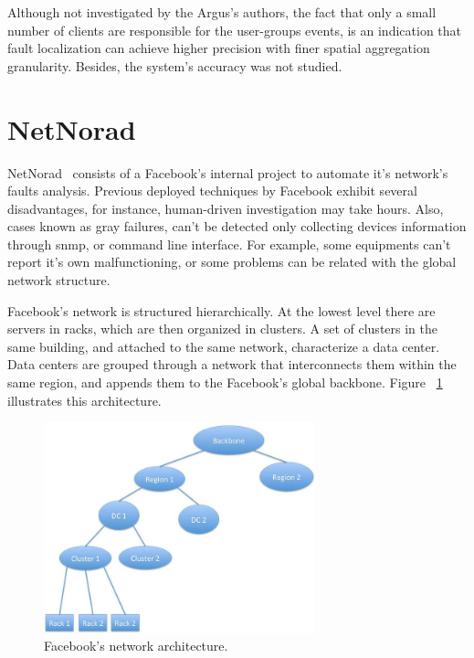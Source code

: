 Although not investigated by the Argus's authors, the fact that only a
small number
of clients are responsible for the user-groups events, is an indication that
fault localization can achieve higher precision
with finer spatial aggregation granularity. Besides, the system's accuracy was
not studied.

\section{NetNorad}

NetNorad~\cite{netnorad} consists of a Facebook's internal project to
automate it's network's faults analysis.
Previous deployed techniques by Facebook exhibit several
disadvantages, for instance,
human-driven investigation may take hours. Also, cases known as gray failures,
can't be detected only collecting devices information through \gls*{snmp},
or command line interface.
For example, some equipments can't report it's own malfunctioning, or
some problems can be related with the global network structure.

Facebook's network is structured hierarchically. At the
lowest level there are servers in racks, which are then organized in
clusters. A set of clusters in the same building, and attached to
the same network, characterize a data center. Data centers are grouped
through a network that interconnects them within the same region, and appends
them to the Facebook's global backbone. Figure
~\ref{fig:netnorad_network_architecture} illustrates this architecture.

\begin{figure}[H]
    \centering
    \includegraphics[width=0.7\textwidth]{./figures/literature_review/netnorad_network_architecture.jpg}
    \caption{Facebook's network architecture.~\cite{netnorad}}
\label{fig:netnorad_network_architecture}
\end{figure}%


